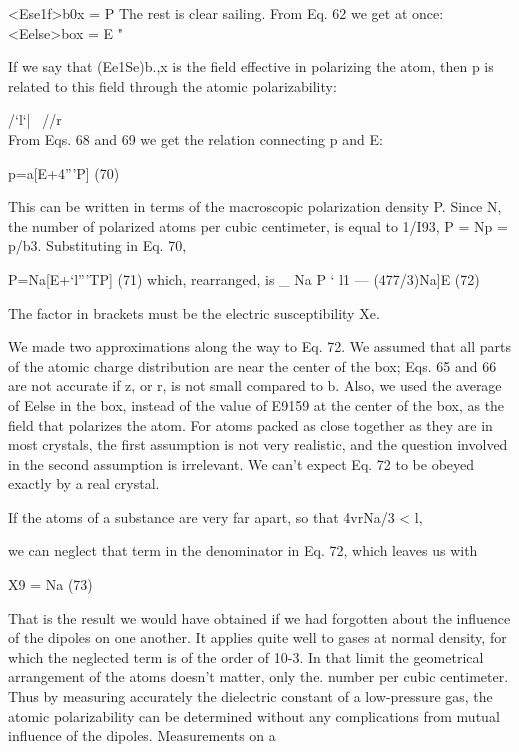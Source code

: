 {{{<Ese1f>b0x =  P 
The rest is clear sailing. From Eq. 62 we get at once:
<Eelse>box = E "  

If we say that (Ee1Se)b.,x is the field effective in polarizing the atom,
then p is related to this field through the atomic polarizability:

/‘l‘| \ //r\\

From Eqs. 68 and 69 we get the relation connecting p and E:

\begin{equation}
\end{equation}
p=a[E+4'''P] (70)

This can be written in terms of the macroscopic polarization density
P. Since N, the number of polarized atoms per cubic centimeter, is
equal to 1/I93, P = Np = p/b3. Substituting in Eq. 70,

\begin{equation}
\end{equation}
P=Na[E+‘l'''TP] (71)
which, rearranged, is
_ Na
P ‘ l1  ---  (477/3)Na]E (72)

The factor in brackets must be the electric susceptibility Xe.

We made two approximations along the way to Eq. 72. We assumed
that all parts of the atomic charge distribution are near the
center of the box; Eqs. 65 and 66 are not accurate if z, or r, is not
small compared to b. Also, we used the average of Eelse in the box,
instead of the value of E9159 at the center of the box, as the field that
polarizes the atom. For atoms packed as close together as they are
in most crystals, the first assumption is not very realistic, and the
question involved in the second assumption is irrelevant. We can't
expect Eq. 72 to be obeyed exactly by a real crystal.

If the atoms of a substance are very far apart, so that 4vrNa/3 < l,

we can neglect that term in the denominator in Eq. 72, which leaves
us with

\begin{equation}
\end{equation}
X9 = Na (73)

That is the result we would have obtained if we had forgotten about
the influence of the dipoles on one another. It applies quite well to
gases at normal density, for which the neglected term is of the order
of 10-3. In that limit the geometrical arrangement of the atoms
doesn't matter, only the. number per cubic centimeter. Thus by
measuring accurately the dielectric constant of a low-pressure gas,
the atomic polarizability can be determined without any complications
from mutual influence of the dipoles. Measurements on a

}}}
